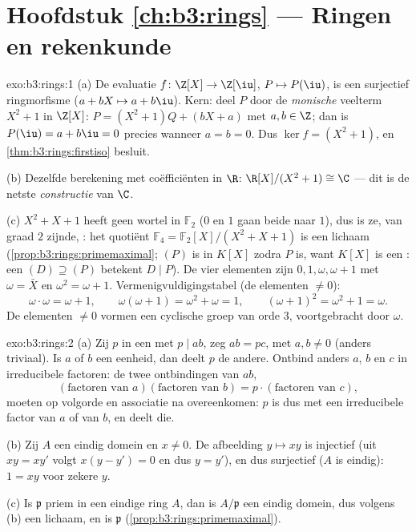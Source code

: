 \section*{Hoofdstuk \ref{ch:b3:rings} --- Ringen en rekenkunde}

\begin{solution}{exo:b3:rings:1}
(a) De evaluatie $f \colon \Z[X] \to \Z[\iu]$, $P \mapsto P(\iu)$,
is een surjectief ringmorfisme ($a + bX \mapsto a + b\iu$). Kern:
deel $P$ door de \emph{monische} veelterm $X^2 + 1$ in $\Z[X]$: $P
= (X^2 + 1)Q + (bX + a)$ met $a, b \in \Z$; dan is $P(\iu) = a +
b\iu = 0$ precies wanneer $a = b = 0$. Dus $\ker f = (X^2+1)$, en
\cref{thm:b3:rings:firstiso} besluit.

(b) Dezelfde berekening met coëfficiënten in $\R$: $\R[X]/(X^2+1)
\cong \C$ --- dit is de netste \emph{constructie} van $\C$.

(c) $X^2 + X + 1$ heeft geen wortel in $\mathbb F_2$ ($0$ en $1$
gaan beide naar $1$), dus is ze, van graad $2$ zijnde,
: het quotiënt $\mathbb F_4 = \mathbb F_2[X]/(X^2+X+1)$
is een lichaam (\cref{prop:b3:rings:primemaximal}; $(P)$ is
 in $K[X]$ zodra $P$  is, want $K[X]$ is een
: een  $(D) \supseteq (P)$ betekent $D \mid
P$). De vier elementen zijn $0, 1, \omega, \omega + 1$ met $\omega
= \bar X$ en $\omega^2 = \omega + 1$. Vermenigvuldigingstabel (de
elementen $\neq 0$):
\[
\omega \cdot \omega = \omega + 1, \qquad
\omega(\omega + 1) = \omega^2 + \omega = 1, \qquad
(\omega+1)^2 = \omega^2 + 1 = \omega .
\]
De elementen $\neq 0$ vormen een cyclische groep van orde $3$,
voortgebracht door $\omega$.
\end{solution}

\begin{solution}{exo:b3:rings:2}
(a) Zij $p$  in een  met $p \mid ab$, zeg $ab = pc$,
met $a, b \neq 0$ (anders triviaal). Is $a$ of $b$ een eenheid, dan
deelt $p$ de andere. Ontbind anders $a$, $b$ en $c$ in irreducibele
factoren: de twee ontbindingen van $ab$,
\[
(\text{factoren van } a)(\text{factoren van } b) = p \cdot
(\text{factoren van } c),
\]
moeten op volgorde en associatie na overeenkomen: $p$ is dus
 met een irreducibele factor van $a$ of van $b$, en
deelt die.

(b) Zij $A$ een eindig domein en $x \neq 0$. De afbeelding $y
\mapsto xy$ is injectief (uit $xy = xy'$ volgt $x(y - y') = 0$ en
dus $y = y'$), en dus surjectief ($A$ is eindig): $1 = xy$ voor
zekere $y$.

(c) Is $\mathfrak p$ priem in een eindige ring $A$, dan is
$A/\mathfrak p$ een eindig domein, dus volgens (b) een lichaam, en
is $\mathfrak p$  (\cref{prop:b3:rings:primemaximal}).
\end{solution}


